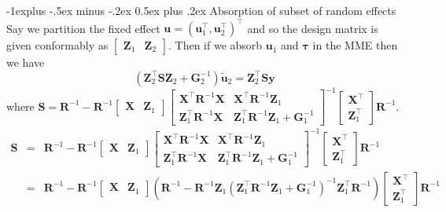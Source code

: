 \documentclass[12pt,landscape, a4paper]{article}
\makeatletter
\newcommand{\bs}[1]{\ensuremath{\boldsymbol{#1}}}
\newcommand{\tp}{{\!\scriptscriptstyle \top}}
\renewcommand{\subsection}{\@startsection{subsection}{2}{0mm}%
                                {-1explus -.5ex minus -.2ex}%
                                {0.5ex plus .2ex}%
                                {\normalfont\normalsize\bfseries}}
\makeatother
\begin{document}
\begin{multicols}{3}
\subsection{Absorption of subset of random effects}
Say we partition the fixed effect $\bs{u} = (\bs{u}_1^\tp, \bs{u}_2^\tp)^\tp$ and so the design matrix is given conformably as $\begin{bmatrix}
\bs{Z}_1 & \bs{Z}_2
\end{bmatrix}$. Then if we absorb $\bs{u}_1$ and $\bs{\tau}$  in the MME then we have
$$ \left(\bs{Z}_2^\tp\bs{S}\bs{Z}_2 + \bs{G}_2^{-1} \right)\tilde{\bs{u}}_2 = \bs{Z}_2^\tp \bs{S}\bs{y}$$
where $\bs{S} = \bs{R}^{-1} - 
\bs{R}^{-1}\begin{bmatrix}
\bs{X} & \bs{Z}_1
\end{bmatrix}
\begin{bmatrix}
\bs{X}^\tp\bs{R}^{-1}\bs{X} & \bs{X}^\tp\bs{R}^{-1}\bs{Z}_1 \\
\bs{Z}_1^\tp\bs{R}^{-1}\bs{X} & \bs{Z}_1^\tp\bs{R}^{-1}\bs{Z}_1 + \bs{G}_1^{-1}
\end{bmatrix}^{-1}\begin{bmatrix}
\bs{X}^\tp \\ 
\bs{Z}_1^\tp
\end{bmatrix}\bs{R}^{-1}$.
\begin{eqnarray}
\bs{S} &=& \bs{R}^{-1} - 
\bs{R}^{-1}\begin{bmatrix}
\bs{X} & \bs{Z}_1
\end{bmatrix}
\begin{bmatrix}
\bs{X}^\tp\bs{R}^{-1}\bs{X} & \bs{X}^\tp\bs{R}^{-1}\bs{Z}_1 \\
\bs{Z}_1^\tp\bs{R}^{-1}\bs{X} & \bs{Z}_1^\tp\bs{R}^{-1}\bs{Z}_1 + \bs{G}_1^{-1}
\end{bmatrix}^{-1}\begin{bmatrix}
\bs{X}^\tp \\ 
\bs{Z}_1^\tp
\end{bmatrix}\bs{R}^{-1}\\
&=& \bs{R}^{-1} - 
\bs{R}^{-1}\begin{bmatrix}
\bs{X} & \bs{Z}_1
\end{bmatrix}
(\bs{R}^{-1} - \bs{R}^{-1}\bs{Z}_1(\bs{Z}_1^\tp\bs{R}^{-1}\bs{Z}_1 + \bs{G}^{-1}_1)^{-1}\bs{Z}^\tp_1\bs{R}^{-1})
\begin{bmatrix}
\bs{X}^\tp \\ 
\bs{Z}_1^\tp
\end{bmatrix}\bs{R}^{-1}\\
\end{eqnarray}




\end{multicols}
\end{document}
